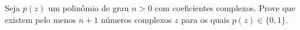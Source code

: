 Seja \(p(z)\) um polinômio de grau \(n>0\) com coeficientes complexos. Prove que existem pelo menos \(n+1\) números complexos \(z\) para os quais \(p(z)\in \{0,1\}\).
